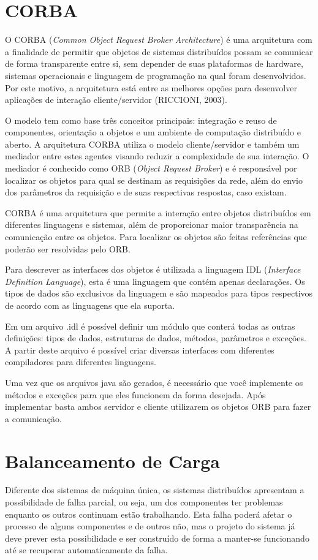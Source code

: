 \section{CORBA}
	O CORBA (\textit{Common Object Request Broker Architecture}) é uma arquitetura com a finalidade de permitir que objetos de sistemas distribuídos possam se comunicar de forma transparente entre si, sem depender de suas plataformas de hardware, sistemas operacionais e linguagem de programação na qual foram desenvolvidos. Por este motivo, a arquitetura está entre as melhores opções para desenvolver aplicações de interação cliente/servidor (RICCIONI, 2003).
	
	O modelo tem como base três conceitos principais: integração e reuso de componentes, orientação a objetos e um ambiente de computação distribuído e aberto. A arquitetura CORBA utiliza o modelo cliente/servidor e também um mediador entre estes agentes visando reduzir a complexidade de sua interação. O mediador é conhecido como ORB (\textit{Object Request Broker}) e é responsável por localizar os objetos para qual se destinam as requisições da rede, além do envio dos parâmetros da requisição e de suas respectivas respostas, caso existam.

	CORBA é uma arquitetura que permite a interação entre objetos distribuídos em diferentes linguagens e sistemas, além de proporcionar maior transparência na comunicação entre os objetos. Para localizar os objetos são feitas referências que poderão ser resolvidas pelo ORB.
	
	Para descrever as interfaces dos objetos é utilizada a linguagem IDL (\textit{Interface Definition Language}), esta é uma linguagem que contém apenas declarações. Os tipos de dados são exclusivos da linguagem e são mapeados para tipos respectivos de acordo com as linguagens que ela suporta.
	
	Em um arquivo .idl é possível definir um módulo que conterá todas as outras definições: tipos de dados, estruturas de dados, métodos, parâmetros e exceções. A partir deste arquivo é possível criar diversas interfaces com diferentes compiladores para diferentes linguagens.
	
	Uma vez que os arquivos java são gerados, é necessário que você implemente os métodos e exceções para que eles funcionem da forma desejada. Após implementar basta ambos servidor e  cliente utilizarem os objetos ORB para fazer a comunicação.

\section{Balanceamento de Carga}
	Diferente dos sistemas de máquina única, os sistemas distribuídos apresentam a possibilidade de falha parcial, ou seja, um dos componentes ter problemas enquanto os outros continuam estão trabalhando. Esta falha poderá afetar o processo de alguns componentes e de outros não, mas o projeto do sistema já deve prever esta possibilidade e ser construído de forma a manter-se funcionando até se recuperar automaticamente da falha.
	
